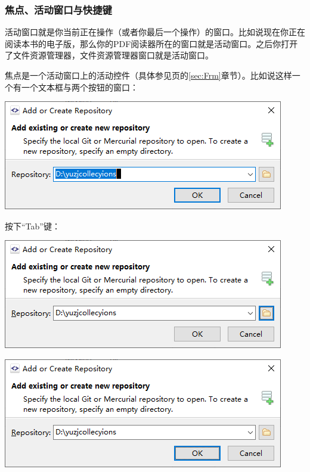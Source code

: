 \subsubsection{焦点、活动窗口与快捷键}
活动窗口就是你当前正在操作（或者你最后一个操作）的窗口。比如说现在你正在阅读本书的电子版，那么你的PDF阅读器所在的窗口就是活动窗口。之后你打开了文件资源管理器，文件资源管理器窗口就是活动窗口。\par
焦点是一个活动窗口上的活动控件（具体参见\pageref{sec:Frm}页的\ref{sec:Frm}章节）。比如说这样一个有一个文本框与两个按钮的窗口：\par
\begin{center}
	\includegraphics{pic/forcus1}
\end{center} \par
按下“Tab”键：\par
\begin{center}
	\includegraphics{pic/forcus2}
\end{center} \par
\begin{center}
	\includegraphics{pic/forcus3}
\end{center} \par
